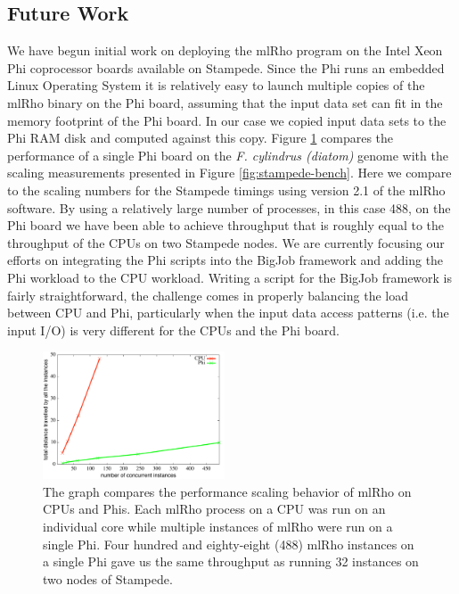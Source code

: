 \documentclass{sig-alternate}
\begin{document}
\subsection{Future Work}
We have begun initial work on deploying the mlRho program on the Intel Xeon Phi coprocessor boards
available on Stampede. Since the Phi runs an embedded Linux Operating System \cite{xeon_phi}
it is relatively easy to launch multiple copies of the mlRho binary on the Phi board, assuming
that the input data set can fit in the memory footprint of the Phi board. In our case we copied input data
sets to the Phi RAM disk and computed against this copy. Figure \ref{fig:mic-scaling} compares the performance
of a single Phi board on the {\it F. cylindrus (diatom)} genome with the scaling measurements presented in Figure
\ref{fig:stampede-bench}. Here we compare to the scaling numbers for the Stampede timings using version 2.1 of
the mlRho software. By using a relatively large number of processes, in this case 488, on the Phi board
we have been able to achieve throughput that is roughly equal to the throughput of the CPUs on two Stampede
nodes. We are currently focusing our efforts on integrating the Phi scripts into the BigJob framework and
adding the Phi workload to the CPU workload. Writing a script for the BigJob framework is fairly
straightforward, the challenge comes in properly balancing the load between CPU and Phi, particularly when the
input data access patterns (i.e. the input I/O) is very different for the CPUs and the Phi board.
\begin{figure} %
\centering
\includegraphics[width=0.48\textwidth]{figures/mic-scaling.pdf}
\caption{The graph compares the performance scaling behavior of mlRho on CPUs and Phis. Each mlRho process on a CPU was run on an individual core while multiple instances of mlRho were run on a single Phi. Four hundred and eighty-eight (488) mlRho instances on a single Phi gave us the same throughput as running 32 instances on two nodes of Stampede.  }
\label{fig:mic-scaling}
\end{figure}
\\
\end{document}
